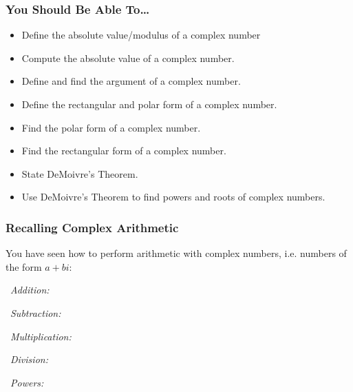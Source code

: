 \documentclass[12pt,xcolor={usenames,dvipsnames,x11names}]{beamer}
\begin{document}
\begin{frame}[plain] \frametitle{You Should Be Able To\dots}
\fontsmall
\begin{itemize} \itemsep=3ex
\item Define the absolute value/modulus of a complex number
\item Compute the absolute value of a complex number.
\item Define and find the argument of a complex number.
\item Define the rectangular and polar form of a complex number.
\item Find the polar form of a complex number.
\item Find the rectangular form of a complex number.
\item State DeMoivre's Theorem.
\item Use DeMoivre's Theorem to find powers and roots of complex numbers.
\end{itemize}
\end{frame}



\begin{frame}[t] \frametitle{Recalling Complex Arithmetic} 
{\small You have seen how to perform arithmetic with complex numbers, i.e. numbers of the form $a + bi$:}

\begin{myex} 
\color{white}
	\textbullet\ {\small \itshape Addition:}  \par\vspace{0.6cm}
	\textbullet\ {\small \itshape Subtraction:}  \par \vspace{0.6cm}
	\textbullet\ {\small \itshape Multiplication:}  \par \vspace{0.6cm}
	\textbullet\ {\small \itshape Division:} \par\vspace{0.2cm}  \par \vspace{0.6cm}
	\textbullet\ {\small \itshape Powers:} 
\end{myex}

\end{frame}
\end{document}
